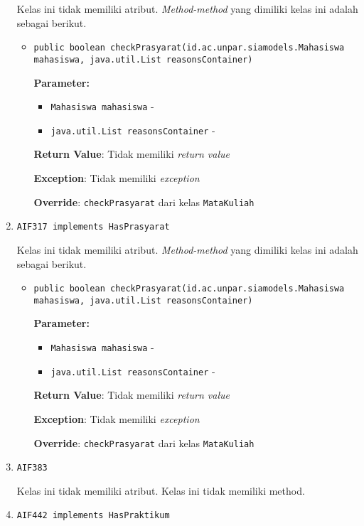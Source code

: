 \documentclass{article}
\begin{document}
\begin{enumerate}
Kelas ini tidak memiliki atribut. \textit{Method-method} yang dimiliki kelas ini adalah sebagai berikut.
\begin{itemize}
\item \texttt{public boolean checkPrasyarat(id.ac.unpar.siamodels.Mahasiswa mahasiswa, java.util.List reasonsContainer)}



\textbf{Parameter:}
\begin{itemize}
\item \texttt{Mahasiswa mahasiswa} - 
\item \texttt{java.util.List reasonsContainer} - 
\end{itemize}
\textbf{Return Value}: Tidak memiliki \textit{return value}

\textbf{Exception}: Tidak memiliki \textit{exception}

\textbf{Override}: \texttt{checkPrasyarat} dari kelas \texttt{MataKuliah}

\end{itemize}
\item \texttt{AIF317 implements HasPrasyarat}



Kelas ini tidak memiliki atribut. \textit{Method-method} yang dimiliki kelas ini adalah sebagai berikut.
\begin{itemize}
\item \texttt{public boolean checkPrasyarat(id.ac.unpar.siamodels.Mahasiswa mahasiswa, java.util.List reasonsContainer)}



\textbf{Parameter:}
\begin{itemize}
\item \texttt{Mahasiswa mahasiswa} - 
\item \texttt{java.util.List reasonsContainer} - 
\end{itemize}
\textbf{Return Value}: Tidak memiliki \textit{return value}

\textbf{Exception}: Tidak memiliki \textit{exception}

\textbf{Override}: \texttt{checkPrasyarat} dari kelas \texttt{MataKuliah}

\end{itemize}
\item \texttt{AIF383}



Kelas ini tidak memiliki atribut. Kelas ini tidak memiliki method. \item \texttt{AIF442 implements HasPraktikum}


\end{enumerate}
\end{document}
